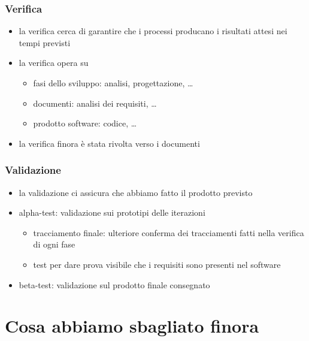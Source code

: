 \begin{frame}
\frametitle{Verifica}

\begin{itemize}
\item la verifica cerca di garantire che i processi producano i risultati attesi nei tempi previsti

\item la verifica opera su

\begin{itemize}
\item fasi dello sviluppo: analisi, progettazione, \ldots
\item documenti: analisi dei requisiti, \ldots
\item prodotto software: codice, \ldots
\end{itemize}

\item la verifica finora è stata rivolta verso i documenti
\end{itemize}


\end{frame}

\begin{frame}
\frametitle{Validazione}

\begin{itemize}
\item la validazione ci assicura che abbiamo fatto il prodotto previsto
\item alpha-test: validazione sui prototipi delle iterazioni
\begin{itemize}
\item tracciamento finale: ulteriore conferma dei tracciamenti fatti nella verifica di ogni fase
\item test per dare prova visibile che i requisiti sono presenti nel software
\end{itemize}

\item beta-test: validazione sul prodotto finale consegnato
\end{itemize}


\end{frame}

\section{Cosa abbiamo sbagliato finora}

